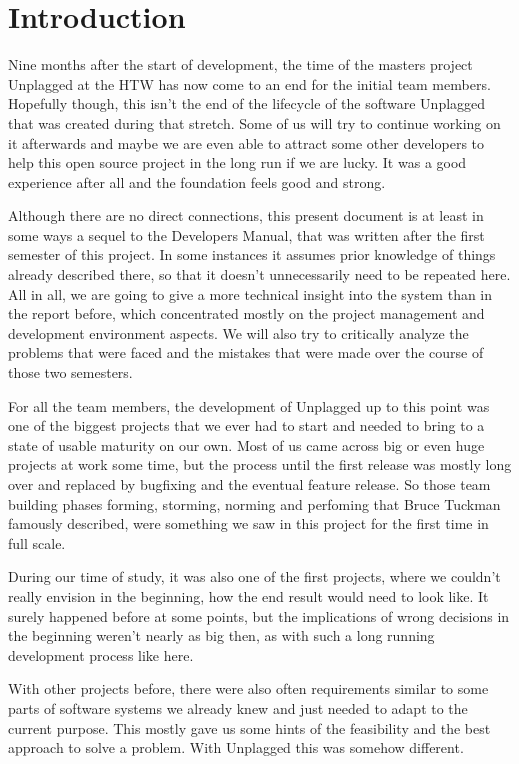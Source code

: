 \chapter*{Introduction}

Nine months after the start of development, the time of the masters project Unplagged at the HTW has now come to an end for the 
initial team members. Hopefully though, 
this isn't the end of the lifecycle of the software Unplagged that was created during that stretch. Some of us will try to continue working on it afterwards and maybe we are even able to attract some other developers to help this open source project in the long run if we are lucky. It was a good experience after all and the foundation feels good and strong.

Although there are no direct connections, this present document is at least in some ways a sequel to the Developers Manual, that was
written after the first semester of this project. In some instances it assumes prior knowledge of things already described there, so that it doesn't unnecessarily need to be repeated here.
All in all, we are going to give a more technical insight into the system than in the report before, which concentrated mostly
on the project management and development environment aspects. We will also try to critically 
analyze the problems that were faced and the mistakes that were made over the course of those
two semesters.

For all the team members, the development of Unplagged up to this point was one of 
the biggest 
projects that we ever had to start and needed to bring to a state of usable 
maturity on our own. Most of us came across big or even huge projects at work some time, but the process until 
the first release was mostly long over and replaced by bugfixing and the eventual feature release.
So those team building phases forming, storming, norming and perfoming that Bruce Tuckman famously described\citep{tuckman1965},
were something we saw in this project for the first time in full scale.

During our time of study, it was also one of the first projects, 
where we couldn't really envision in the beginning, how the end result would need to look like. It surely happened before at some points, but the implications of wrong decisions in the beginning weren't nearly as big then, as with such a long running development process like here.

With other projects before, there were also often requirements similar to some
parts of software systems we already knew and just needed to adapt to the current purpose.
This mostly gave us some hints of the feasibility and the best approach to solve a problem.
With Unplagged this was somehow different.

